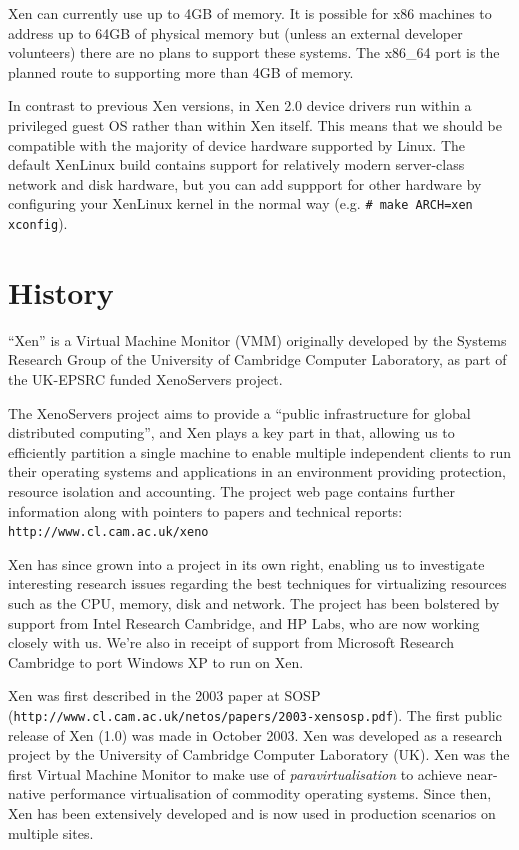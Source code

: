\documentclass[11pt,twoside,final,openright]{xenstyle}
\begin{document}
Xen can currently use up to 4GB of memory.  It is possible for x86
machines to address up to 64GB of physical memory but (unless an
external developer volunteers) there are no plans to support these
systems.  The x86\_64 port is the planned route to supporting more
than 4GB of memory.

In contrast to previous Xen versions, in Xen 2.0 device drivers run
within a privileged guest OS rather than within Xen itself. This means
that we should be compatible with the majority of device hardware
supported by Linux.  The default XenLinux build contains support for
relatively modern server-class network and disk hardware, but you can
add suppport for other hardware by configuring your XenLinux kernel in
the normal way (e.g. \verb_# make ARCH=xen xconfig_).

\section{History}


``Xen'' is a Virtual Machine Monitor (VMM) originally developed by the
Systems Research Group of the University of Cambridge Computer
Laboratory, as part of the UK-EPSRC funded XenoServers project.

The XenoServers project aims to provide a ``public infrastructure for
global distributed computing'', and Xen plays a key part in that,
allowing us to efficiently partition a single machine to enable
multiple independent clients to run their operating systems and
applications in an environment providing protection, resource
isolation and accounting.  The project web page contains further
information along with pointers to papers and technical reports:
{\tt http://www.cl.cam.ac.uk/xeno}

Xen has since grown into a project in its own right, enabling us to
investigate interesting research issues regarding the best techniques
for virtualizing resources such as the CPU, memory, disk and network.
The project has been bolstered by support from Intel Research
Cambridge, and HP Labs, who are now working closely with us. We're
also in receipt of support from Microsoft Research Cambridge to port
Windows XP to run on Xen.

Xen was first described in the 2003 paper at SOSP \\
({\tt http://www.cl.cam.ac.uk/netos/papers/2003-xensosp.pdf}).
The first public release of Xen (1.0) was made in October 2003.  Xen
was developed as a research project by the University of Cambridge
Computer Laboratory (UK).  Xen was the first Virtual Machine Monitor
to make use of {\em paravirtualisation} to achieve near-native
performance virtualisation of commodity operating systems.  Since
then, Xen has been extensively developed and is now used in production
scenarios on multiple sites.
\end{document}

